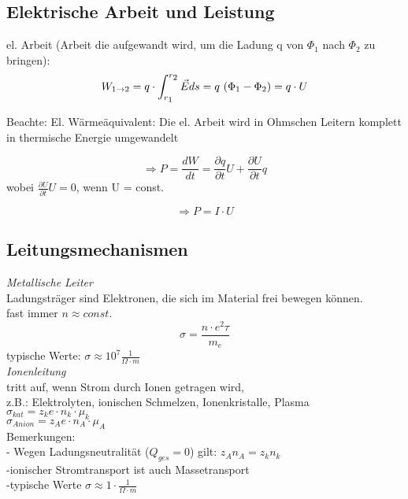 \documentclass[a4paper,12pt]{report}
\begin{document}
\subsection{Elektrische Arbeit und Leistung}
el. Arbeit (Arbeit die aufgewandt wird, um die Ladung q von $ \Phi_1$ nach $ \Phi_2 $ zu bringen):\\
\begin{equation}
W_{1\rightarrow2} = q\cdot \int_{r\textsubscript{1}}^{r\textsubscript{2}} \vec{E}ds = q\ (\Phi_1 - \Phi_2) = q\cdot U
\end{equation}

Beachte: El. Wärmeäquivalent: Die el. Arbeit wird in Ohmschen Leitern komplett in thermische Energie umgewandelt


\begin{equation}
\Rightarrow P = \frac{dW}{dt} = \frac{\partial q}{\partial t} U + \frac{\partial U}{\partial t} q  
\end{equation}
wobei $ \frac{\partial U }{\partial t} U = 0 $, wenn U = const.

\begin{equation}
\Rightarrow P = I\cdot U
\end{equation}

\subsection{Leitungsmechanismen}
\emph {Metallische Leiter}\\
Ladungsträger sind Elektronen, die sich im Material frei bewegen können.\\
fast immer $ n \approx const.$ \\
\begin{equation}
\sigma = \frac{n\cdot e^2 \tau}{m_e}
\end{equation}
typische Werte: $ \sigma \approx 10^7 \frac{1}{\Omega \cdot m}$ \\

\emph{Ionenleitung}\\
tritt auf, wenn Strom durch Ionen getragen wird,\\
z.B.: Elektrolyten, ionischen Schmelzen, Ionenkristalle, Plasma\\
$ \sigma_{kat} = z_ke \cdot n_k \cdot \mu_k$\\
$\sigma_{Anion} = z_Ae \cdot n_A \cdot \mu_A$\\

Bemerkungen: \\
- Wegen Ladungsneutralität ($ Q_{ges} = 0 $) gilt: $z_A n_A = z_k n_k$\\
-ionischer Stromtransport ist auch Massetransport\\
-typische Werte $ \sigma \approx 1 \cdot \frac{1}{\Omega\cdot m} $\\
\end{document}
